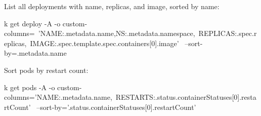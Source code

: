 \begin{tcbitemize}[
  raster columns=3, raster equal height=rows,
  blanker, cheat subtitle
]
\begin{tcbitemize}[
      raster columns=1, raster equal height=rows,
      blanker, cheat subtitle
    ]
      \tcbitem
          {\fontsize{6.5}{7.5}\selectfont\sffamily
          List all deployments with name, replicas, and image, sorted by name:}
          \begin{cheatcodebash}
          k get deploy -A -o custom-columns=\
              'NAME:.metadata.name,NS:.metadata.namespace,\
              REPLICAS:.spec.replicas,\
              IMAGE:.spec.template.spec.containers[0].image' \
            --sort-by=.metadata.name
          \end{cheatcodebash}
          \vspace{-0.5ex}
          {\fontsize{6.5}{7.5}\selectfont\sffamily
          Sort pods by restart count:}
          \begin{cheatcodebash}
          k get pods -A -o custom-columns='NAME:.metadata.name,\
             RESTARTS:.status.containerStatuses[0].restartCount' \
             --sort-by='.status.containerStatuses[0].restartCount'
          \end{cheatcodebash}

    \end{tcbitemize}

  \tcbitem
    \begin{tcbitemize}[
      raster columns=1, raster equal height=rows,
      blanker, cheat subtitle
    ]


\end{tcbitemize}
\end{tcbitemize}
